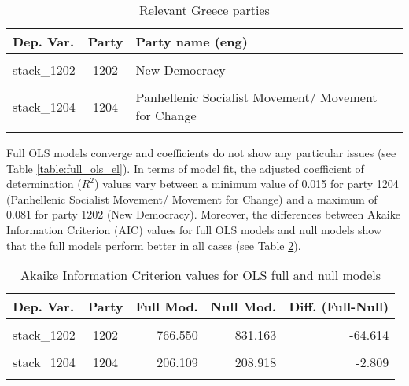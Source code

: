 \documentclass[
]{article}
\begin{document}
\begin{table}[!h]

\caption{\label{tab:unnamed-chunk-77}Relevant Greece parties \label{table:relprty_tab_el}}
\centering
\begin{tabular}[t]{lcl}
\toprule
Dep. Var. & Party & Party name (eng)\\
\midrule
\cellcolor{gray!6}{stack\_1201} & \cellcolor{gray!6}{1201} & \cellcolor{gray!6}{Coalition of the Radical Left}\\
stack\_1202 & 1202 & New Democracy\\
\cellcolor{gray!6}{stack\_1203} & \cellcolor{gray!6}{1203} & \cellcolor{gray!6}{Golden Dawn}\\
stack\_1204 & 1204 & Panhellenic Socialist Movement/ Movement for Change\\
\cellcolor{gray!6}{stack\_1205} & \cellcolor{gray!6}{1205} & \cellcolor{gray!6}{Communist Party of Greece}\\
\bottomrule
\end{tabular}
\end{table}

Full OLS models converge and coefficients do not show any particular issues (see Table
\ref{table:full_ols_el}).
In terms of model fit, the adjusted coefficient of determination (\(R^2\)) values vary between
a minimum value of 0.015
for party 1204
(Panhellenic Socialist Movement/ Movement for Change)
and a maximum of 0.081
for party 1202
(New Democracy).
Moreover, the differences between Akaike Information Criterion (AIC) values for full OLS models and null
models show that the full models perform better in all cases (see Table \ref{table:ols_aic_el}).

\begin{table}[!h]

\caption{\label{tab:unnamed-chunk-78}Akaike Information Criterion values for OLS full and null models 
        \label{table:ols_aic_el}}
\centering
\begin{tabular}[t]{lcrrr}
\toprule
Dep. Var. & Party & Full Mod. & Null Mod. & Diff. (Full-Null)\\
\midrule
\cellcolor{gray!6}{stack\_1201} & \cellcolor{gray!6}{1201} & \cellcolor{gray!6}{822.224} & \cellcolor{gray!6}{839.980} & \cellcolor{gray!6}{-17.757}\\
stack\_1202 & 1202 & 766.550 & 831.163 & -64.614\\
\cellcolor{gray!6}{stack\_1203} & \cellcolor{gray!6}{1203} & \cellcolor{gray!6}{131.977} & \cellcolor{gray!6}{163.404} & \cellcolor{gray!6}{-31.427}\\
stack\_1204 & 1204 & 206.109 & 208.918 & -2.809\\
\cellcolor{gray!6}{stack\_1205} & \cellcolor{gray!6}{1205} & \cellcolor{gray!6}{237.283} & \cellcolor{gray!6}{258.529} & \cellcolor{gray!6}{-21.246}\\
\bottomrule
\end{tabular}
\end{table}
\end{document}

